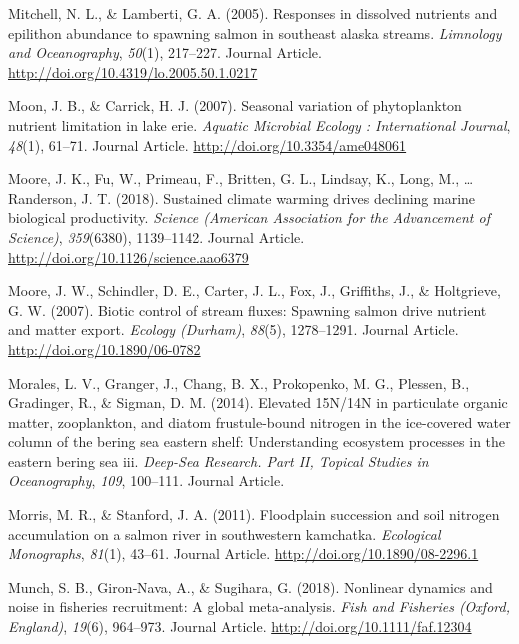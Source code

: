 \documentclass [11pt, proquest] {uwthesis}[2015/03/03]
\begin{document}
\hypertarget{ref-Mitchell2005}{}
Mitchell, N. L., \& Lamberti, G. A. (2005). Responses in dissolved
nutrients and epilithon abundance to spawning salmon in southeast alaska
streams. \emph{Limnology and Oceanography}, \emph{50}(1), 217--227.
Journal Article. \url{http://doi.org/10.4319/lo.2005.50.1.0217}

\hypertarget{ref-Moon2007}{}
Moon, J. B., \& Carrick, H. J. (2007). Seasonal variation of
phytoplankton nutrient limitation in lake erie. \emph{Aquatic Microbial
Ecology : International Journal}, \emph{48}(1), 61--71. Journal Article.
\url{http://doi.org/10.3354/ame048061}

\hypertarget{ref-Moore2018}{}
Moore, J. K., Fu, W., Primeau, F., Britten, G. L., Lindsay, K., Long,
M., \ldots{} Randerson, J. T. (2018). Sustained climate warming drives
declining marine biological productivity. \emph{Science (American
Association for the Advancement of Science)}, \emph{359}(6380),
1139--1142. Journal Article.
\url{http://doi.org/10.1126/science.aao6379}

\hypertarget{ref-Moore2007}{}
Moore, J. W., Schindler, D. E., Carter, J. L., Fox, J., Griffiths, J.,
\& Holtgrieve, G. W. (2007). Biotic control of stream fluxes: Spawning
salmon drive nutrient and matter export. \emph{Ecology (Durham)},
\emph{88}(5), 1278--1291. Journal Article.
\url{http://doi.org/10.1890/06-0782}

\hypertarget{ref-Morales2014}{}
Morales, L. V., Granger, J., Chang, B. X., Prokopenko, M. G., Plessen,
B., Gradinger, R., \& Sigman, D. M. (2014). Elevated 15N/14N in
particulate organic matter, zooplankton, and diatom frustule-bound
nitrogen in the ice-covered water column of the bering sea eastern
shelf: Understanding ecosystem processes in the eastern bering sea iii.
\emph{Deep-Sea Research. Part II, Topical Studies in Oceanography},
\emph{109}, 100--111. Journal Article.

\hypertarget{ref-Morris2011}{}
Morris, M. R., \& Stanford, J. A. (2011). Floodplain succession and soil
nitrogen accumulation on a salmon river in southwestern kamchatka.
\emph{Ecological Monographs}, \emph{81}(1), 43--61. Journal Article.
\url{http://doi.org/10.1890/08-2296.1}

\hypertarget{ref-Munch2018}{}
Munch, S. B., Giron‐Nava, A., \& Sugihara, G. (2018). Nonlinear dynamics
and noise in fisheries recruitment: A global meta‐analysis. \emph{Fish
and Fisheries (Oxford, England)}, \emph{19}(6), 964--973. Journal
Article. \url{http://doi.org/10.1111/faf.12304}
\end{document}
